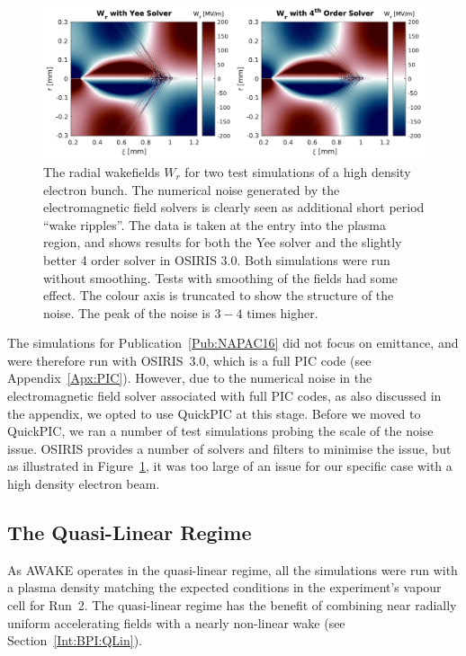 \begin{figure}[hbt]
    \centering
    \includegraphics[width=0.999\linewidth]{figures/EMFSolverNoise}
    \caption{\label{Fig:SimA:EMFNoise}
        The radial wakefields $W_r$ for two test simulations of a high density electron bunch.
        The numerical noise generated by the electromagnetic field solvers is clearly seen as additional short period ``wake ripples''.
        The data is taken at the entry into the plasma region, and shows results for both the Yee solver and the slightly better 4 order solver in OSIRIS 3.0.
        Both simulations were run without smoothing.
        Tests with smoothing of the fields had some effect.
        The colour axis is truncated to show the structure of the noise.
        The peak of the noise is $3-4$ times higher.
    }
\end{figure}

The simulations for Publication~\ref{Pub:NAPAC16} did not focus on emittance, and were therefore run with OSIRIS~3.0, which is a full PIC code (see Appendix~\ref{Apx:PIC}).
However, due to the numerical noise in the electromagnetic field solver associated with full PIC codes, as also discussed in the appendix, we opted to use QuickPIC at this stage.
Before we moved to QuickPIC, we ran a number of test simulations probing the scale of the noise issue.
OSIRIS provides a number of solvers and filters to minimise the issue, but as illustrated in Figure~\ref{Fig:SimA:EMFNoise}, it was too large of an issue for our specific case with a high density electron beam.

\subsection{The Quasi-Linear Regime}
\label{SimA:QLin}

As AWAKE operates in the quasi-linear regime, all the simulations were run with a plasma density matching the expected conditions in the experiment's vapour cell for Run~2.
The quasi-linear regime has the benefit of combining near radially uniform accelerating fields with a nearly non-linear wake (see Section~\ref{Int:BPI:QLin}).


